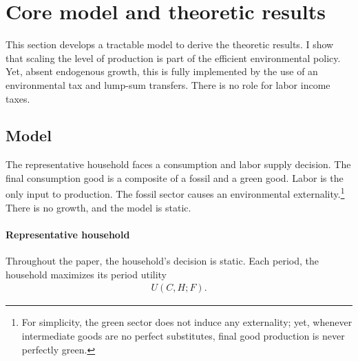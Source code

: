 \section{Core model and theoretic results}\label{sec:mod_an}

This section develops a tractable model  to derive the theoretic results. I show that scaling the level of production is part of the efficient environmental policy. Yet, absent endogenous growth, this is fully implemented by the use of an environmental tax and lump-sum transfers. There is no role for labor income taxes.

\subsection{Model}
The representative household faces a consumption and labor supply decision. The final consumption good is a composite of a fossil and a green good. Labor is the only input to production. The fossil sector causes an environmental externality.\footnote{ For simplicity, the green sector does not induce any externality; yet, whenever intermediate goods are no perfect substitutes, final good production is never perfectly green.} There is no growth, and the model is static.

\paragraph{Representative household}
Throughout the paper, the household's decision is static. Each period, the household maximizes its period utility
\begin{align*}
U(C,H; F).
\end{align*} 

